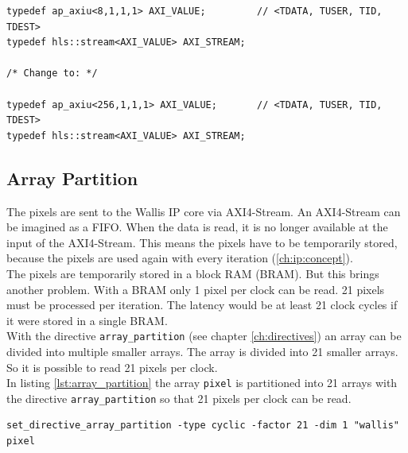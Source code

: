 
\begin{minipage}{\textwidth}
\begin{lstlisting}[style=CStyle, caption=Calculation of the division for the Wallis filter, label=lst:division]
typedef ap_axiu<8,1,1,1> AXI_VALUE;			// <TDATA, TUSER, TID, TDEST>
typedef hls::stream<AXI_VALUE> AXI_STREAM;

/* Change to: */

typedef ap_axiu<256,1,1,1> AXI_VALUE;		// <TDATA, TUSER, TID, TDEST>
typedef hls::stream<AXI_VALUE> AXI_STREAM;
\end{lstlisting}
\end{minipage}

\subsection{Array Partition}
The pixels are sent to the Wallis IP core via AXI4-Stream. An AXI4-Stream can be imagined as a FIFO. When the data is read, it is no longer available at the input of the AXI4-Stream. This means the pixels have to be temporarily stored, because the pixels are used again with every iteration (\ref{ch:ip:concept}). \\
The pixels are temporarily stored in a block RAM (BRAM). But this brings another
problem. With a BRAM only 1 pixel per clock can be read. 21 pixels must be
processed per iteration. The latency would be at least 21 clock cycles if it
were stored in a single BRAM. \\
With the directive \texttt{array\_partition} (see chapter \ref{ch:directives})
an array can be divided into multiple smaller arrays. The array is divided into 21 smaller arrays. So it is possible to read 21 pixels per clock. \\
In listing \ref{lst:array_partition} the array \texttt{pixel} is partitioned into 21 arrays with the directive \texttt{array\_partition} so that 21 pixels per clock can be read. 

\begin{minipage}{\textwidth}
\begin{lstlisting}[style=TextStyle, caption=Set directive array\_partition, label=lst:array_partition]
set_directive_array_partition -type cyclic -factor 21 -dim 1 "wallis" pixel
\end{lstlisting}
\end{minipage}



